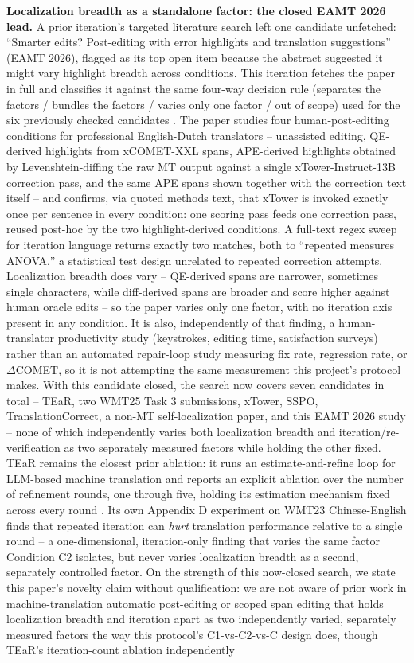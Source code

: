 \documentclass[11pt,letterpaper]{article}
\begin{document}
\textbf{Localization breadth as a standalone factor: the closed EAMT 2026 lead.} A prior iteration's targeted literature search left one candidate unfetched: ``Smarter edits? Post-editing with error highlights and translation suggestions'' (EAMT 2026), flagged as its top open item because the abstract suggested it might vary highlight breadth across conditions. This iteration fetches the paper in full and classifies it against the same four-way decision rule (separates the factors / bundles the factors / varies only one factor / out of scope) used for the six previously checked candidates \citep{vanTellingen2026}. The paper studies four human-post-editing conditions for professional English-Dutch translators -- unassisted editing, QE-derived highlights from xCOMET-XXL spans, APE-derived highlights obtained by Levenshtein-diffing the raw MT output against a single xTower-Instruct-13B correction pass, and the same APE spans shown together with the correction text itself -- and confirms, via quoted methods text, that xTower is invoked exactly once per sentence in every condition: one scoring pass feeds one correction pass, reused post-hoc by the two highlight-derived conditions. A full-text regex sweep for iteration language returns exactly two matches, both to ``repeated measures ANOVA,'' a statistical test design unrelated to repeated correction attempts. Localization breadth does vary -- QE-derived spans are narrower, sometimes single characters, while diff-derived spans are broader and score higher against human oracle edits -- so the paper varies only one factor, with no iteration axis present in any condition. It is also, independently of that finding, a human-translator productivity study (keystrokes, editing time, satisfaction surveys) rather than an automated repair-loop study measuring fix rate, regression rate, or $\Delta$COMET, so it is not attempting the same measurement this project's protocol makes. With this candidate closed, the search now covers seven candidates in total -- TEaR, two WMT25 Task 3 submissions, xTower, SSPO, TranslationCorrect, a non-MT self-localization paper, and this EAMT 2026 study -- none of which independently varies both localization breadth and iteration/re-verification as two separately measured factors while holding the other fixed. TEaR remains the closest prior ablation: it runs an estimate-and-refine loop for LLM-based machine translation and reports an explicit ablation over the number of refinement rounds, one through five, holding its estimation mechanism fixed across every round \citep{Feng2025}. Its own Appendix D experiment on WMT23 Chinese-English finds that repeated iteration can \emph{hurt} translation performance relative to a single round -- a one-dimensional, iteration-only finding that varies the same factor Condition C2 isolates, but never varies localization breadth as a second, separately controlled factor. On the strength of this now-closed search, we state this paper's novelty claim without qualification: we are not aware of prior work in machine-translation automatic post-editing or scoped span editing that holds localization breadth and iteration apart as two independently varied, separately measured factors the way this protocol's C1-vs-C2-vs-C design does, though TEaR's iteration-count ablation independently 
\end{document}
